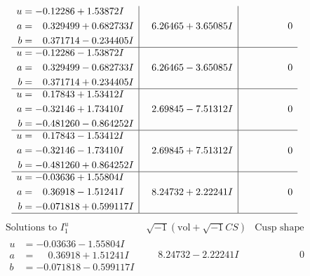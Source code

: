 \documentclass[1p]{elsarticle_modified}
\theoremstyle{definition}
\newcommand{\I}{\sqrt{-1}}
\begin{document}
$$\begin{array}{c|c|c}
\begin{aligned}
u &= -0.12286 + 1.53872 I \\
a &= \phantom{-}0.329499 + 0.682733 I \\
b &= \phantom{-}0.371714 - 0.234405 I\end{aligned}
 & \phantom{-}6.26465 + 3.65085 I & \phantom{-0.000000 } 0 \\ \hline\begin{aligned}
u &= -0.12286 - 1.53872 I \\
a &= \phantom{-}0.329499 - 0.682733 I \\
b &= \phantom{-}0.371714 + 0.234405 I\end{aligned}
 & \phantom{-}6.26465 - 3.65085 I & \phantom{-0.000000 } 0 \\ \hline\begin{aligned}
u &= \phantom{-}0.17843 + 1.53412 I \\
a &= -0.32146 + 1.73410 I \\
b &= -0.481260 - 0.864252 I\end{aligned}
 & \phantom{-}2.69845 - 7.51312 I & \phantom{-0.000000 } 0 \\ \hline\begin{aligned}
u &= \phantom{-}0.17843 - 1.53412 I \\
a &= -0.32146 - 1.73410 I \\
b &= -0.481260 + 0.864252 I\end{aligned}
 & \phantom{-}2.69845 + 7.51312 I & \phantom{-0.000000 } 0 \\ \hline\begin{aligned}
u &= -0.03636 + 1.55804 I \\
a &= \phantom{-}0.36918 - 1.51241 I \\
b &= -0.071818 + 0.599117 I\end{aligned}
 & \phantom{-}8.24732 + 2.22241 I & \phantom{-0.000000 } 0\\
 \hline 
 \end{array}$$\newpage$$\begin{array}{c|c|c}  
\text{Solutions to }I^u_{1}& \I (\text{vol} + \sqrt{-1}CS) & \text{Cusp shape}\\
 \hline 
\begin{aligned}
u &= -0.03636 - 1.55804 I \\
a &= \phantom{-}0.36918 + 1.51241 I \\
b &= -0.071818 - 0.599117 I\end{aligned}
 & \phantom{-}8.24732 - 2.22241 I & \phantom{-0.000000 } 0 \\ \hline\begin{aligned}

\end{aligned}
\end{array}$$
\end{document}
